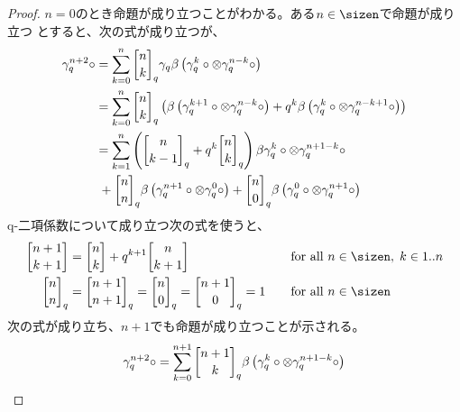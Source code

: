 {\begin{proof}
		$n=0$のとき命題が成り立つことがわかる。ある$n\in\sizen$で命題が成り立つ
		とすると、次の式が成り立つが、
		\begin{equation*}\begin{split}
			\gamma_q^{n+2}\circ &= \sum_{k=0}^n \qbinom{n}{k}_q \gamma_q
				\beta\lr{\gamma_q^k\circ\otimes\gamma_q^{n-k}\circ} \\
			&= \sum_{k=0}^n \qbinom{n}{k}_q\lr{
				\beta\lr{\gamma_q^{k+1}\circ\otimes\gamma_q^{n-k}\circ}
				+ q^k \beta\lr{\gamma_q^k\circ\otimes\gamma_q^{n-k+1}\circ}} \\
			&= \sum_{k=1}^n \lr{\qbinom{n}{k-1}_q + q^k \qbinom{n}{k}_q}
				\beta{\gamma_q^k\circ\otimes\gamma_q^{n+1-k}\circ} \\
			&\; + \qbinom{n}{n}_q 
			\beta\lr{\gamma_q^{n+1}\circ\otimes\gamma_q^{0}\circ}
				+ \qbinom{n}{0}_q 
				\beta\lr{\gamma_q^{0}\circ\otimes\gamma_q^{n+1}\circ} \\
		\end{split}\end{equation*}
		q-二項係数について成り立つ次の式を使うと、
		\begin{alignat*}{2}
			\qbinom{n+1}{k+1} &= \qbinom{n}{k} + q^{k+1}\qbinom{n}{k+1}
			&\quad& \text{for all } n\in\sizen,\; k\in1..n \\
			\qbinom{n}{n}_q &= \qbinom{n+1}{n+1}_q 
			= \qbinom{n}{0}_q = \qbinom{n+1}{0}_q = 1 
			&\quad& \text{for all } n\in\sizen
		\end{alignat*}
		次の式が成り立ち、$n+1$でも命題が成り立つことが示される。
		\begin{equation*}\begin{split}
			\gamma_q^{n+2}\circ &= \sum_{k=0}^{n+1} \qbinom{n+1}{k}_q
				\beta\lr{\gamma_q^k\circ\otimes\gamma_q^{n+1-k}\circ} \\
		\end{split}\end{equation*}
	\end{proof} %

}
